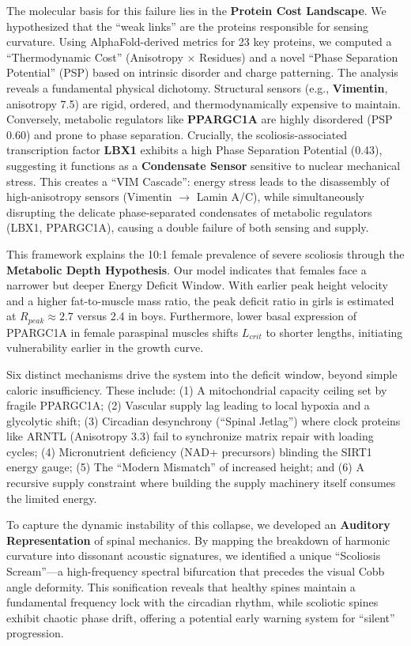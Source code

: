 \documentclass[11pt]{article}
\begin{document}
The molecular basis for this failure lies in the \textbf{Protein Cost Landscape}. We hypothesized that the ``weak links'' are the proteins responsible for sensing curvature. Using AlphaFold-derived metrics for 23 key proteins, we computed a ``Thermodynamic Cost'' (Anisotropy $\times$ Residues) and a novel ``Phase Separation Potential'' (PSP) based on intrinsic disorder and charge patterning. The analysis reveals a fundamental physical dichotomy. Structural sensors (e.g., \textbf{Vimentin}, anisotropy 7.5) are rigid, ordered, and thermodynamically expensive to maintain. Conversely, metabolic regulators like \textbf{PPARGC1A} are highly disordered (PSP 0.60) and prone to phase separation. Crucially, the scoliosis-associated transcription factor \textbf{LBX1} exhibits a high Phase Separation Potential (0.43), suggesting it functions as a \textbf{Condensate Sensor} sensitive to nuclear mechanical stress. This creates a ``VIM Cascade'': energy stress leads to the disassembly of high-anisotropy sensors (Vimentin $\to$ Lamin A/C), while simultaneously disrupting the delicate phase-separated condensates of metabolic regulators (LBX1, PPARGC1A), causing a double failure of both sensing and supply.

This framework explains the 10:1 female prevalence of severe scoliosis through the \textbf{Metabolic Depth Hypothesis}. Our model indicates that females face a narrower but deeper Energy Deficit Window. With earlier peak height velocity and a higher fat-to-muscle mass ratio, the peak deficit ratio in girls is estimated at $R_{peak} \approx 2.7$ versus 2.4 in boys. Furthermore, lower basal expression of PPARGC1A in female paraspinal muscles\cite{handschin2024} shifts $L_{crit}$ to shorter lengths, initiating vulnerability earlier in the growth curve.

Six distinct mechanisms drive the system into the deficit window, beyond simple caloric insufficiency. These include: (1) A mitochondrial capacity ceiling set by fragile PPARGC1A; (2) Vascular supply lag leading to local hypoxia and a glycolytic shift; (3) Circadian desynchrony (``Spinal Jetlag'') where clock proteins like ARNTL (Anisotropy 3.3) fail to synchronize matrix repair with loading cycles\cite{dudek2017}; (4) Micronutrient deficiency (NAD+ precursors) blinding the SIRT1 energy gauge; (5) The ``Modern Mismatch'' of increased height; and (6) A recursive supply constraint where building the supply machinery itself consumes the limited energy.

To capture the dynamic instability of this collapse, we developed an \textbf{Auditory Representation} of spinal mechanics. By mapping the breakdown of harmonic curvature into dissonant acoustic signatures, we identified a unique ``Scoliosis Scream''—a high-frequency spectral bifurcation that precedes the visual Cobb angle deformity. This sonification reveals that healthy spines maintain a fundamental frequency lock with the circadian rhythm, while scoliotic spines exhibit chaotic phase drift, offering a potential early warning system for ``silent'' progression.
\end{document}
